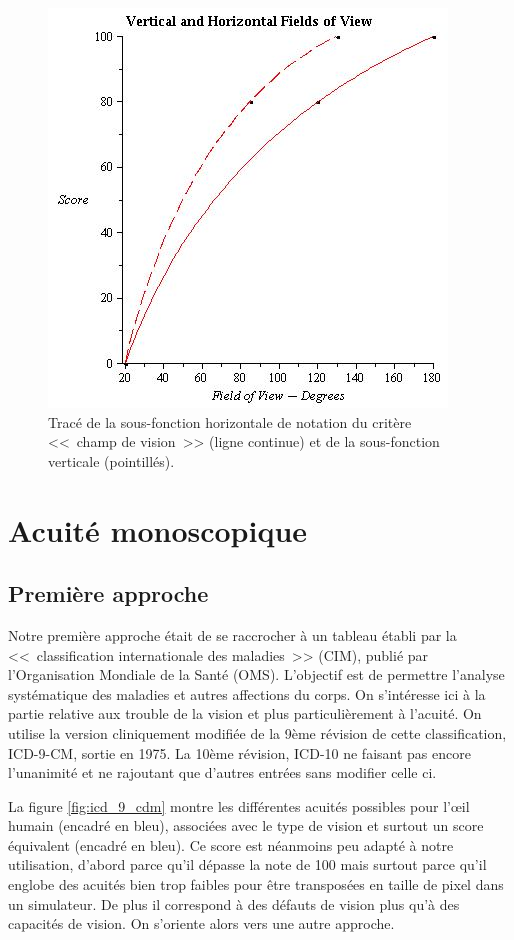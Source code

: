 	\begin{figure}
		\centering
		\includegraphics[scale=1]{Figures/FOV}
		\caption{Tracé de la sous-fonction horizontale de notation du critère <<~champ de vision~>> (ligne continue) et de la sous-fonction verticale (pointillés).}
		\label{fig:score_fov}
	\end{figure}
	
	\section{Acuité monoscopique}
	
	\subsection{Première approche}	
	\par Notre première approche était de se raccrocher à un tableau établi par la <<~classification internationale des maladies~>> (CIM), publié par l'Organisation Mondiale de la Santé (OMS). L'objectif est de permettre l'analyse systématique des maladies et autres affections du corps. On s'intéresse ici à la partie relative aux trouble de la vision et plus particulièrement à l'acuité. On utilise la version cliniquement modifiée de la 9ème révision de cette classification, ICD-9-CM, sortie en 1975. La 10ème révision, ICD-10 ne faisant pas encore l'unanimité et ne rajoutant que d'autres entrées sans modifier celle ci.
	
	\par La figure \ref{fig:icd_9_cdm} montre les différentes acuités possibles pour l'œil humain (encadré en bleu), associées avec le type de vision et surtout un score équivalent (encadré en bleu). Ce score est néanmoins peu adapté à notre utilisation, d'abord parce qu'il dépasse la note de 100 mais surtout parce qu'il englobe des acuités bien trop faibles pour être transposées en taille de pixel dans un simulateur. De plus il correspond à des défauts de vision plus qu'à des capacités de vision. On s'oriente alors vers une autre approche.
	
